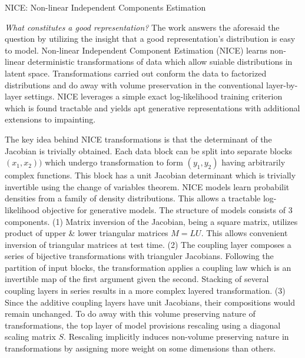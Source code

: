 \documentclass[11pt,letterpaper]{article}
\begin{document}
\begin{center}
  \large{NICE: Non-linear Independent Components Estimation}
\end{center}

\textit{What constitutes a good representation?} The work answers the aforesaid the question by utilizing the insight that a good representation's distribution is easy to model. Non-linear Independent Component Estimation (NICE) learns non-linear deterministic transformations of data which allow suiable distributions in latent space. Transformations carried out conform the data to factorized distributions and do away with volume preservation in the conventional layer-by-layer settings. NICE leverages a simple exact log-likelihood training criterion which is found tractable and yields apt generative representations with additional extensions to impainting.

The key idea behind NICE transformations is that the determinant of the Jacobian is trivially obtained.  Each data block can be split into separate blocks $(x_{1},x_{2}))$ which undergo transformation to form $(y_{1},y_{2})$ having arbitrarily complex functions. This block has a unit Jacobian determinant which is trivially invertible using the change of variables theorem. NICE models learn probabilit densities from a family of density distributions. This allows a tractable log-likelihood objective for generative models. The structure of models consists of 3 components. (1) Matrix inversion of the Jacobian, being a square matrix, utilizes product of upper \& lower triangular matrices $M = LU$. This allows convenient inversion of triangular matrices at test time. (2) The coupling layer composes a series of bijective transformations with trianguler Jacobians. Following the partition of input blocks, the transformation applies a coupling law which is an invertible map of the first argument given the second. Stacking of several coupling layers in series results in a more complex layered transformation. (3) Since the additive coupling layers have unit Jacobians, their compositions would remain unchanged. To do away with this volume preserving nature of transformations, the top layer of model provisions rescaling using a diagonal scaling matrix $S$. Rescaling implicitly induces non-volume preserving nature in transformations by assigning more weight on some dimensions than others. 
\end{document}
